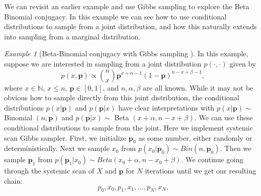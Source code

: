 \documentclass[11pt]{amsart}
\theoremstyle{theorem} %
\theoremstyle{definition}                  %
\theoremstyle{example}                       %
\theoremstyle{remark}                       %
\newtheorem{exmp}[thm]{Example}  %
\numberwithin{equation}{section}
\newcommand{\N}{\mathbb{N}}
\begin{document}
We can revisit an earlier example and use Gibbs sampling to explore the Beta Binomial conjugacy. In this example we can see how to use conditional distributions to sample from a joint distribution, and how this naturally extends into sampling from a marginal distribution.


\begin{exmp}[{Beta-Binomial conjugacy with Gibbs sampling \cite{gibbs}}]
\label{ex:gibbsex}
In this example, suppose we are interested in sampling from a joint distribution $p(\cdot,\cdot)$ given by 
\[p(x,\mathbf{p}) \propto {n \choose x} \mathbf{p}^{x+\alpha-1}(1-\mathbf{p})^{n-x+\beta-1},\]
where $x\in \N$, $x \leq n$, $\mathbf{p} \in [0,1]$, and $n, \alpha, \beta$ are all known. While it may not be obvious how to sample directly from this joint distribution, the conditional distributions $p(x|\mathbf{p})$ and $p(\mathbf{p}|x)$ have clear interpretations with $p(x|\mathbf{p})\sim$ Binomial $(n,\mathbf{p})$ and $p(\mathbf{p}|x)\sim$ Beta $(x+\alpha,n-x+\beta)$. We can use these conditional distributions to sample from the joint. Here we implement systemic scan Gibbs sampler. First, we initialize $\mathbf{p}_0$ as some number, either randomly or deterministically. Next we sample $x_0$ from $p(x_0|\mathbf{p}_0)\sim Bin(n, \mathbf{p}_0)$. Then we sample $\mathbf{p}_1$ from $p(\mathbf{p}_1|x_0)\sim Beta(x_0+\alpha, n-x_0+\beta)$. We continue going through the systemic scan of $X$ and $\mathbf{p}$ for $N$ iterations until we get our resulting chain:
\[p_0, x_0, p_1, x_1, ..., p_N, x_N.\]


\end{exmp}
\end{document}
